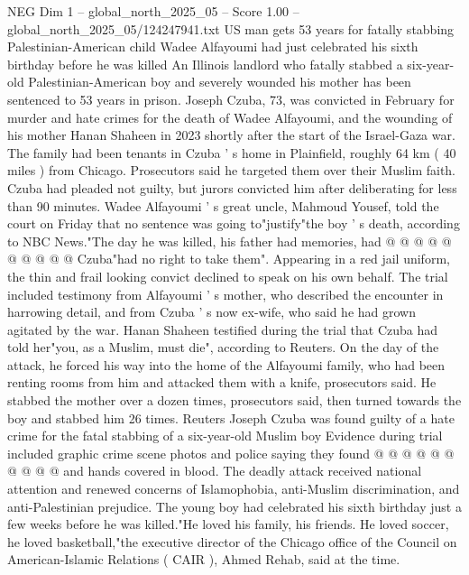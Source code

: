\begin{textsample}{NEG Dim 1 – global\_north\_2025\_05 – Score 1.00 – global\_north\_2025\_05/124247941.txt}  \label{ex:f1_neg_235}
US man gets 53 years for fatally stabbing Palestinian-American child Wadee Alfayoumi had just celebrated his sixth birthday before he was killed An Illinois landlord who fatally stabbed a six-year-old Palestinian-American boy and severely wounded his mother has been sentenced to 53 years in prison.
Joseph Czuba, 73, was convicted in February for murder and hate crimes for the death of Wadee Alfayoumi, and the wounding of his mother Hanan Shaheen in 2023 shortly after the start of the Israel-Gaza war.
The family had been tenants in Czuba ' s home in Plainfield, roughly 64 km ( 40 miles ) from Chicago.
Prosecutors said he targeted them over their Muslim faith.
Czuba had pleaded not guilty, but jurors convicted him after deliberating for less than 90 minutes.
Wadee Alfayoumi ' s great uncle, Mahmoud Yousef, told the court on Friday that no sentence was going to"justify"the boy ' s death, according to NBC News."The day he was killed, his father had memories, had @ @ @ @ @ @ @ @ @ @ Czuba"had no right to take them".
Appearing in a red jail uniform, the thin and frail looking convict declined to speak on his own behalf.
The trial included testimony from Alfayoumi ' s mother, who described the encounter in harrowing detail, and from Czuba ' s now ex-wife, who said he had grown agitated by the war.
Hanan Shaheen testified during the trial that Czuba had told her"you, as a Muslim, must die", according to Reuters.
On the day of the attack, he forced his way into the home of the Alfayoumi family, who had been renting rooms from him and attacked them with a knife, prosecutors said.
He stabbed the mother over a dozen times, prosecutors said, then turned towards the boy and stabbed him 26 times.
Reuters Joseph Czuba was found guilty of a hate crime for the fatal stabbing of a six-year-old Muslim boy Evidence during trial included graphic crime scene photos and police saying they found @ @ @ @ @ @ @ @ @ @ and hands covered in blood.
The deadly attack received national attention and renewed concerns of Islamophobia, anti-Muslim discrimination, and anti-Palestinian prejudice.
The young boy had celebrated his sixth birthday just a few weeks before he was killed."He loved his family, his friends.
He loved soccer, he loved basketball,"the executive director of the Chicago office of the Council on American-Islamic Relations ( CAIR ), Ahmed Rehab, said at the time.

\end{textsample}

